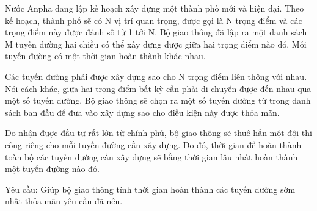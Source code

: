 Nước Anpha đang lập kế hoạch xây dựng một thành phố mới và hiện đại. Theo kế hoạch, thành phố sẽ có N vị trí quan trọng, được gọi là N trọng điểm và các trọng điểm này được đánh số từ 1 tới N. Bộ giao thông đã lập ra một danh sách M tuyến đường hai chiều có thể xây dựng được giữa hai trọng điểm nào đó. Mỗi tuyến đường có một thời gian hoàn thành khác nhau.  

   Các tuyến đường phải được xây dựng sao cho N trọng điểm liên thông với nhau. Nói cách khác, giữa hai trọng điểm bất kỳ cần phải di chuyển được đến nhau qua một số tuyến đường. Bộ giao thông sẽ chọn ra một số tuyến đường từ trong danh sách ban đầu để đưa vào xây dựng sao cho điều kiện này được thỏa mãn.  

   Do nhận được đầu tư rất lớn từ chính phủ, bộ giao thông sẽ thuê hẳn một đội thi công riêng cho mỗi tuyến đường cần xây dựng. Do đó, thời gian để hoàn thành toàn bộ các tuyến đường cần xây dựng sẽ bằng thời gian lâu nhất hoàn thành một tuyến đường nào đó.  

   Yêu cầu: Giúp bộ giao thông tính thời gian hoàn thành các tuyến đường sớm nhất thỏa mãn yêu cầu đã nêu.
